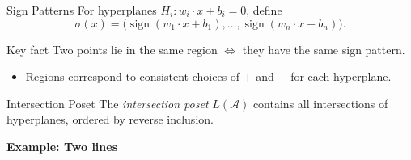 \documentclass{beamer}
\begin{document}
\begin{frame}{Sign Patterns}
For hyperplanes $H_i: w_i \cdot x + b_i = 0$, define
\[
\sigma(x)=\bigl(\operatorname{sign}(w_1\cdot x+b_1),\dots,\operatorname{sign}(w_n\cdot x+b_n)\bigr).
\]

\begin{block}{Key fact}
Two points lie in the same region $\iff$ they have the same sign pattern.
\end{block}

\pause

\begin{itemize}
\item Regions correspond to consistent choices of $+$ and $-$ for each hyperplane.
\end{itemize}
\end{frame}

\begin{frame}{Intersection Poset}
The \emph{intersection poset} $L(\mathcal{A})$ contains all intersections of hyperplanes, ordered by reverse inclusion.

\medskip
\begin{center}
\textbf{Example: Two lines}
\end{center}

\begin{columns}[c]

\begin{center}
\end{center}

\begin{center}
\end{center}
\end{columns}
\end{frame}
\end{document}
